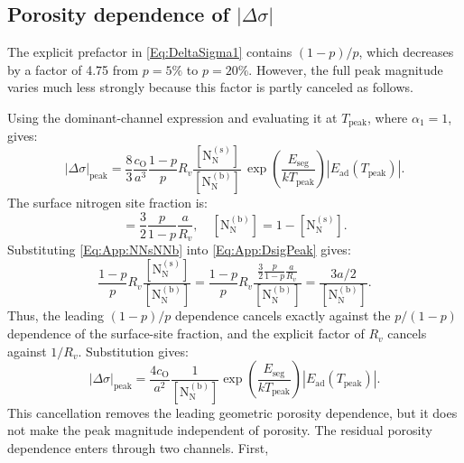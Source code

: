 \documentclass[preprint,12pt,sort&compress]{elsarticle}
\newcommand{\?}{\stackrel{?}{=}}
\begin{document}
\subsection{Porosity dependence of \texorpdfstring{$|\Delta\sigma|$}{|Delta sigma|}}
\label{App:Tpeak:Porosity}

The explicit prefactor in \cref{Eq:DeltaSigma1} contains $(1-p)/p$, which decreases by a factor of 4.75 from $p=5\%$ to $p=20\%$. However, the full peak magnitude varies much less strongly because this factor is partly canceled as follows.

Using the dominant-channel expression and evaluating it at $T_\text{peak}$, where $\alpha_1=1$, gives:
\begin{equation}
|\Delta\sigma|_\text{peak} = \frac{8}{3} \frac{c_\text{O}}{a^3} \frac{1-p}{p} R_v \frac{ [\text{N}_\text{N}^{(\text{s})}] } { [\text{N}_\text{N}^{(\text{b})}] } \, \exp\!\left( \frac{E_\text{seg}}{kT_\text{peak}} \right) \left|E_\text{ad}(T_\text{peak})\right|.
\label{Eq:App:DsigPeak}
\end{equation}
The surface nitrogen site fraction is:
\begin{equation}
[\text{N}_\text{N}^{(\text{s})}] = \frac{3}{2} \frac{p}{1-p} \frac{a}{R_v},
\quad
[\text{N}_\text{N}^{(\text{b})}] = 1 - [\text{N}_\text{N}^{(\text{s})}].
\label{Eq:App:NNsNNb}
\end{equation}
Substituting \cref{Eq:App:NNsNNb} into \cref{Eq:App:DsigPeak} gives:
\begin{equation}
\frac{1-p}{p} R_v \frac{ [\text{N}_\text{N}^{(\text{s})}] } { [\text{N}_\text{N}^{(\text{b})}] }
= \frac{1-p}{p} R_v \frac{ \frac{3}{2} \frac{p}{1-p} \frac{a}{R_v} } { [\text{N}_\text{N}^{(\text{b})}]
}
= \frac{3a/2}{[\text{N}_\text{N}^{(\text{b})}]}.
\label{Eq:App:cancel}
\end{equation}
Thus, the leading $(1-p)/p$ dependence cancels exactly against the $p/(1-p)$ dependence of the surface-site fraction, and the explicit factor of $R_v$ cancels against $1/R_v$. Substitution gives:
\begin{equation}
|\Delta\sigma|_\text{peak} = \frac{4c_\text{O}}{a^2} \frac{1}{[\text{N}_\text{N}^{(\text{b})}]}
\exp\!\left( \frac{E_\text{seg}}{kT_\text{peak}} \right) \left|E_\text{ad}(T_\text{peak})\right|.
\label{Eq:App:DsigPeakReduced}
\end{equation}
This cancellation removes the leading geometric porosity dependence, but it does not make the peak magnitude independent of porosity. The residual porosity dependence enters through two channels. First,
\end{document}

